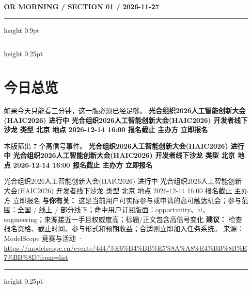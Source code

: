 \documentclass[10.5pt]{ctexart}
\begin{document}
{\small\bfseries OR MORNING / SECTION 01 / 2026-11-27}
\vspace{2mm}
\hrule height 0.9pt
\vspace{1.5mm}
\hrule height 0.25pt
\vspace{4mm}
\section*{今日总览}
{\color{ormuted} 如果今天只能看三分钟，这一版必须已经足够。}
\vspace{2mm}
{\fontsize{25}{29}\selectfont\bfseries 光合组织2026人工智能创新大会(HAIC2026) 进行中 光合组织2026人工智能创新大会(HAIC2026) 开发者线下沙龙 类型 北京 地点 2026-12-14 16:00 报名截止 主办方 立即报名}\par
\vspace{2mm}
{\large 本版筛出 7 个高信号事件。}
\vspace{3mm}
{\Large\bfseries 光合组织2026人工智能创新大会(HAIC2026) 进行中 光合组织2026人工智能创新大会(HAIC2026) 开发者线下沙龙 类型 北京 地点 2026-12-14 16:00 报名截止 主办方 立即报名}\par
光合组织2026人工智能创新大会(HAIC2026) 进行中 光合组织2026人工智能创新大会(HAIC2026) 开发者线下沙龙 类型 北京 地点 2026-12-14 16:00 报名截止 主办方 立即报名
\textbf{与你有关：} 这是当前用户可实际参与或申请的高可触达机会；参与范围：全国 / 线上 / 部分线下；命中用户订阅版面：opportunity、ai、engineering；来源接近一手且权威度高；标题/正文包含高信号变化
\textbf{建议：} 检查报名资格、截止时间、参与形式和预期收益；合适则立即加入任务系统。
{\footnotesize\color{ormuted} 来源：ModelScope 竞赛与活动 · \url{https://modelscope.cn/events/444/%E6%B4%BB%E5%8A%A8%E4%BB%8B%E7%BB%8D?from=list}}
\vspace{3mm}
\hrule height 0.25pt
\vspace{3mm}
\end{document}
